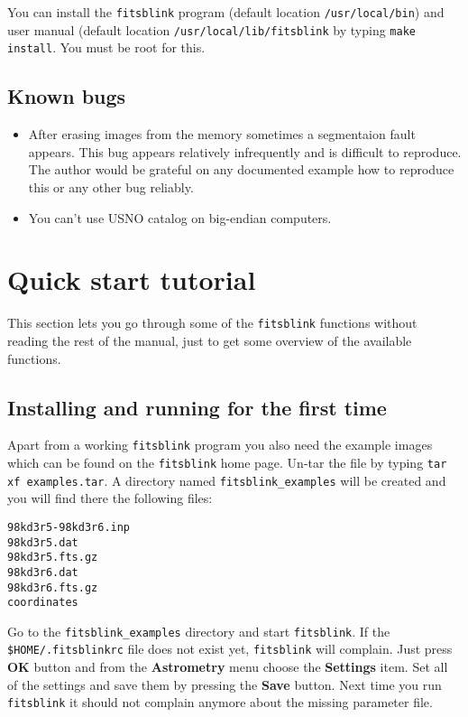 \documentclass[11pt]{article}
\begin{document}
You can install the \verb=fitsblink= program (default location
\verb=/usr/local/bin=) and user manual (default location
\verb=/usr/local/lib/fitsblink= by typing \verb=make install=.  You
must be root for this.

\subsection{Known bugs}

\begin{itemize}
\item After erasing images from the memory sometimes a segmentaion fault
appears.  This bug appears relatively infrequently and is difficult to
reproduce.  The author would be grateful on any documented example how
to reproduce this or any other bug reliably.
\item You can't use USNO catalog on big-endian computers.
\end{itemize}


\section{Quick start tutorial}

This section lets you go through some of the \verb=fitsblink=
functions without reading the rest of the manual, just to get some
overview of the available functions.

\subsection{Installing and running for the first time}

Apart from a working \verb=fitsblink= program you also need the
example images which can be found on the \verb=fitsblink= home page.
Un-tar the file by typing \verb=tar xf examples.tar=.  A directory
named \verb=fitsblink_examples= will be created and you will find
there the following files:

\begin{verbatim}
98kd3r5-98kd3r6.inp
98kd3r5.dat
98kd3r5.fts.gz
98kd3r6.dat
98kd3r6.fts.gz
coordinates
\end{verbatim}

Go to the \verb=fitsblink_examples= directory and start
\verb=fitsblink=.  If the \verb=$HOME/.fitsblinkrc= file does not
exist yet, \verb=fitsblink= will complain.  Just press \textbf{OK}
button and from the \textbf{Astrometry} menu choose the
\textbf{Settings} item.  Set all of the settings and save them by
pressing the \textbf{Save} button.  Next time you run \verb=fitsblink=
it should not complain anymore about the missing parameter file.
\end{document}

